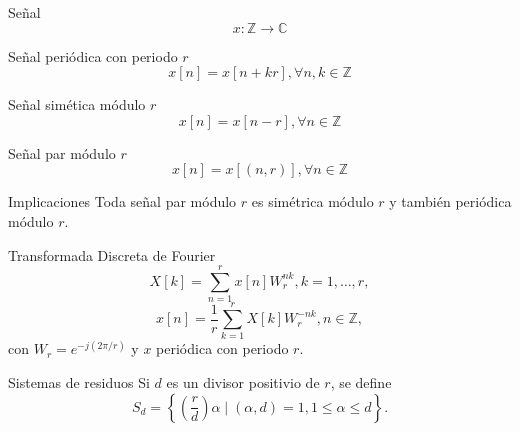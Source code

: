\documentclass{beamer}
\begin{document}
\begin{frame}{Señal}
    \begin{equation*}
        x : \mathbb{Z} \longrightarrow \mathbb{C}
    \end{equation*} 
\end{frame}

\begin{frame}{Señal periódica con periodo $r$}
    \begin{equation*}
        x[n] = x[n + k r], \forall n, k \in \mathbb{Z}
    \end{equation*}
\end{frame}

\begin{frame}{Señal simética módulo $r$}
    \begin{equation*}
        x[n] = x[n - r], \forall n \in \mathbb{Z}
    \end{equation*}
\end{frame}

\begin{frame}{Señal par módulo $r$}
    \begin{equation*}
        x[n] = x[(n,r)], \forall n \in \mathbb{Z}
    \end{equation*}
\end{frame}

\begin{frame}{Implicaciones}
    Toda señal par módulo $r$ es simétrica módulo $r$ y también periódica módulo $r$.
\end{frame}

\begin{frame}{Transformada Discreta de Fourier}
    \begin{equation*}
        X[k] = \sum_{n=1}^{r} x[n] W_r^{n k}, k = 1,\ldots,r,
    \end{equation*}
    \begin{equation*}
        x[n] = \frac{1}{r} \sum_{k=1}^{r} X[k] W_r^{-n k}, n \in \mathbb{Z},
    \end{equation*}
    con $W_r = e^{-j (2 \pi / r)}$ y $x$ periódica con periodo $r$.
\end{frame}

\begin{frame}{Sistemas de residuos}
    Si $d$ es un divisor positivio de $r$, se define
    \begin{equation*}
        S_d = \left\{ \left( \frac{r}{d} \right) \alpha \mid (\alpha, d) = 1, 1 \le \alpha \le d \right\}.
    \end{equation*}
\end{frame}
\end{document}
